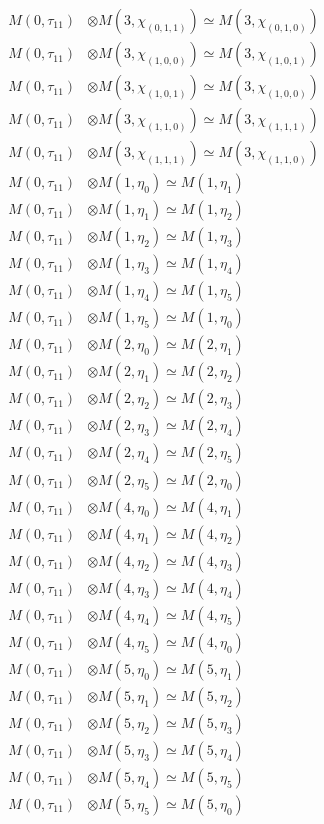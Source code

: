 \begin{align*}
M(0,\tau_{11}) &\otimes M(3,\chi_{(0,1,1)}) \simeq M(3,\chi_{(0,1,0)}) \\
M(0,\tau_{11}) &\otimes M(3,\chi_{(1,0,0)}) \simeq M(3,\chi_{(1,0,1)}) \\
M(0,\tau_{11}) &\otimes M(3,\chi_{(1,0,1)}) \simeq M(3,\chi_{(1,0,0)}) \\
M(0,\tau_{11}) &\otimes M(3,\chi_{(1,1,0)}) \simeq M(3,\chi_{(1,1,1)}) \\
M(0,\tau_{11}) &\otimes M(3,\chi_{(1,1,1)}) \simeq M(3,\chi_{(1,1,0)}) \\
M(0,\tau_{11}) &\otimes M(1,\eta_{0}) \simeq M(1,\eta_{1}) \\
M(0,\tau_{11}) &\otimes M(1,\eta_{1}) \simeq M(1,\eta_{2}) \\
M(0,\tau_{11}) &\otimes M(1,\eta_{2}) \simeq M(1,\eta_{3}) \\
M(0,\tau_{11}) &\otimes M(1,\eta_{3}) \simeq M(1,\eta_{4}) \\
M(0,\tau_{11}) &\otimes M(1,\eta_{4}) \simeq M(1,\eta_{5}) \\
M(0,\tau_{11}) &\otimes M(1,\eta_{5}) \simeq M(1,\eta_{0}) \\
M(0,\tau_{11}) &\otimes M(2,\eta_{0}) \simeq M(2,\eta_{1}) \\
M(0,\tau_{11}) &\otimes M(2,\eta_{1}) \simeq M(2,\eta_{2}) \\
M(0,\tau_{11}) &\otimes M(2,\eta_{2}) \simeq M(2,\eta_{3}) \\
M(0,\tau_{11}) &\otimes M(2,\eta_{3}) \simeq M(2,\eta_{4}) \\
M(0,\tau_{11}) &\otimes M(2,\eta_{4}) \simeq M(2,\eta_{5}) \\
M(0,\tau_{11}) &\otimes M(2,\eta_{5}) \simeq M(2,\eta_{0}) \\
M(0,\tau_{11}) &\otimes M(4,\eta_{0}) \simeq M(4,\eta_{1}) \\
M(0,\tau_{11}) &\otimes M(4,\eta_{1}) \simeq M(4,\eta_{2}) \\
M(0,\tau_{11}) &\otimes M(4,\eta_{2}) \simeq M(4,\eta_{3}) \\
M(0,\tau_{11}) &\otimes M(4,\eta_{3}) \simeq M(4,\eta_{4}) \\
M(0,\tau_{11}) &\otimes M(4,\eta_{4}) \simeq M(4,\eta_{5}) \\
M(0,\tau_{11}) &\otimes M(4,\eta_{5}) \simeq M(4,\eta_{0}) \\
M(0,\tau_{11}) &\otimes M(5,\eta_{0}) \simeq M(5,\eta_{1}) \\
M(0,\tau_{11}) &\otimes M(5,\eta_{1}) \simeq M(5,\eta_{2}) \\
M(0,\tau_{11}) &\otimes M(5,\eta_{2}) \simeq M(5,\eta_{3}) \\
M(0,\tau_{11}) &\otimes M(5,\eta_{3}) \simeq M(5,\eta_{4}) \\
M(0,\tau_{11}) &\otimes M(5,\eta_{4}) \simeq M(5,\eta_{5}) \\
M(0,\tau_{11}) &\otimes M(5,\eta_{5}) \simeq M(5,\eta_{0}) \\
\end{align*}

